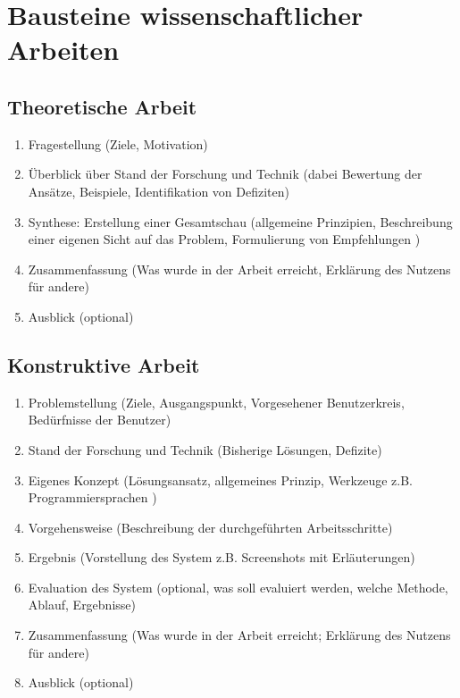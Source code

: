 \chapter{Bausteine wissenschaftlicher Arbeiten}\label{sec:anhang}

\section{Theoretische Arbeit}\label{subsec:a1}

\begin{enumerate}
    \item{Fragestellung (Ziele, Motivation)}
    \item{Überblick über Stand der Forschung und Technik (dabei Bewertung der Ansätze, Beispiele, Identifikation von Defiziten)}
    \item{Synthese: Erstellung einer Gesamtschau (allgemeine Prinzipien, Beschreibung einer eigenen Sicht auf das Problem, Formulierung von Empfehlungen )}
    \item{Zusammenfassung (Was wurde in der Arbeit erreicht, Erklärung des Nutzens für andere)}
    \item{Ausblick (optional)}
\end{enumerate}

\section{Konstruktive Arbeit}\label{subsec:a2}

\begin{enumerate}
    \item{Problemstellung (Ziele, Ausgangspunkt, Vorgesehener Benutzerkreis, Bedürfnisse der Benutzer)}
    \item{Stand der Forschung und Technik (Bisherige Lösungen, Defizite)}
    \item{Eigenes Konzept (Lösungsansatz, allgemeines Prinzip, Werkzeuge z.B. Programmiersprachen )}
    \item{Vorgehensweise (Beschreibung der durchgeführten Arbeitsschritte)}
    \item{Ergebnis (Vorstellung des System z.B. Screenshots mit Erläuterungen)}
    \item{Evaluation des System (optional, was soll evaluiert werden, welche Methode, Ablauf, Ergebnisse)}
    \item{Zusammenfassung (Was wurde in der Arbeit erreicht; Erklärung des Nutzens für andere)}
    \item{Ausblick (optional)}
\end{enumerate}

